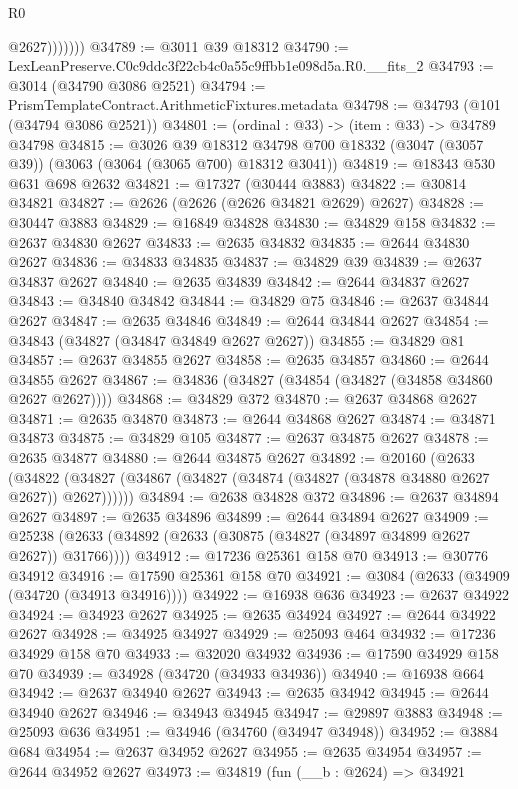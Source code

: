 \begin{lexlean}{R0}
\begin{coremodule}
                  @2627)))))))
@34789 := @3011 @39 @18312
@34790 := LexLeanPreserve.C0c9ddc3f22cb4c0a55c9ffbb1e098d5a.R0.__fits_2
@34793 := @3014 (@34790 @3086 @2521)
@34794 := PrismTemplateContract.ArithmeticFixtures.metadata
@34798 := @34793 (@101 (@34794 @3086 @2521))
@34801 := (ordinal : @33) -> (item : @33) -> @34789 @34798
@34815 := @3026
    @39
    @18312
    @34798
    @700
    @18332
    (@3047 (@3057 @39))
    (@3063 (@3064 (@3065 @700) @18312 @3041))
@34819 := @18343 @530 @631 @698 @2632
@34821 := @17327 (@30444 @3883)
@34822 := @30814 @34821
@34827 := @2626 (@2626 (@2626 @34821 @2629) @2627)
@34828 := @30447 @3883
@34829 := @16849 @34828
@34830 := @34829 @158
@34832 := @2637 @34830 @2627
@34833 := @2635 @34832
@34835 := @2644 @34830 @2627
@34836 := @34833 @34835
@34837 := @34829 @39
@34839 := @2637 @34837 @2627
@34840 := @2635 @34839
@34842 := @2644 @34837 @2627
@34843 := @34840 @34842
@34844 := @34829 @75
@34846 := @2637 @34844 @2627
@34847 := @2635 @34846
@34849 := @2644 @34844 @2627
@34854 := @34843 (@34827 (@34847 @34849 @2627 @2627))
@34855 := @34829 @81
@34857 := @2637 @34855 @2627
@34858 := @2635 @34857
@34860 := @2644 @34855 @2627
@34867 := @34836 (@34827 (@34854 (@34827 (@34858 @34860 @2627 @2627))))
@34868 := @34829 @372
@34870 := @2637 @34868 @2627
@34871 := @2635 @34870
@34873 := @2644 @34868 @2627
@34874 := @34871 @34873
@34875 := @34829 @105
@34877 := @2637 @34875 @2627
@34878 := @2635 @34877
@34880 := @2644 @34875 @2627
@34892 := @20160
    (@2633 (@34822 (@34827 (@34867 (@34827 (@34874 (@34827 (@34878 @34880 @2627 @2627)) @2627))))))
@34894 := @2638 @34828 @372
@34896 := @2637 @34894 @2627
@34897 := @2635 @34896
@34899 := @2644 @34894 @2627
@34909 := @25238 (@2633 (@34892 (@2633 (@30875 (@34827 (@34897 @34899 @2627 @2627)) @31766))))
@34912 := @17236 @25361 @158 @70
@34913 := @30776 @34912
@34916 := @17590 @25361 @158 @70
@34921 := @3084 (@2633 (@34909 (@34720 (@34913 @34916))))
@34922 := @16938 @636
@34923 := @2637 @34922
@34924 := @34923 @2627
@34925 := @2635 @34924
@34927 := @2644 @34922 @2627
@34928 := @34925 @34927
@34929 := @25093 @464
@34932 := @17236 @34929 @158 @70
@34933 := @32020 @34932
@34936 := @17590 @34929 @158 @70
@34939 := @34928 (@34720 (@34933 @34936))
@34940 := @16938 @664
@34942 := @2637 @34940 @2627
@34943 := @2635 @34942
@34945 := @2644 @34940 @2627
@34946 := @34943 @34945
@34947 := @29897 @3883
@34948 := @25093 @636
@34951 := @34946 (@34760 (@34947 @34948))
@34952 := @3884 @684
@34954 := @2637 @34952 @2627
@34955 := @2635 @34954
@34957 := @2644 @34952 @2627
@34973 := @34819
    (fun (__b : @2624) =>
    @34921

\end{coremodule}
\end{lexlean}
